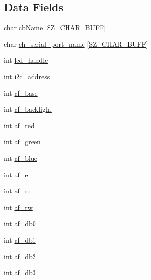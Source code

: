 \subsection*{Data Fields}
\begin{DoxyCompactItemize}
\item 
char \hyperlink{struct___i_i_c_l_c_d_a3f9347595482a6da5cb5d536d937a554}{cb\+Name} \mbox{[}\hyperlink{skn__common__headers_8h_a8d2978ad614b0de81c60483e706d9306}{S\+Z\+\_\+\+C\+H\+A\+R\+\_\+\+B\+U\+F\+F}\mbox{]}
\item 
char \hyperlink{struct___i_i_c_l_c_d_a2f193b0806fdbba1d644567835e2b2e8}{ch\+\_\+serial\+\_\+port\+\_\+name} \mbox{[}\hyperlink{skn__common__headers_8h_a8d2978ad614b0de81c60483e706d9306}{S\+Z\+\_\+\+C\+H\+A\+R\+\_\+\+B\+U\+F\+F}\mbox{]}
\item 
int \hyperlink{struct___i_i_c_l_c_d_afc74b2d9120be4a8e69e48b220d6781c}{lcd\+\_\+handle}
\item 
int \hyperlink{struct___i_i_c_l_c_d_a3f3fe8757875939b987ac0c416081551}{i2c\+\_\+address}
\item 
int \hyperlink{struct___i_i_c_l_c_d_ae74954b1b96523d617a68e42c2663086}{af\+\_\+base}
\item 
int \hyperlink{struct___i_i_c_l_c_d_ad160086a31276fbaf849855519b9878e}{af\+\_\+backlight}
\item 
int \hyperlink{struct___i_i_c_l_c_d_aca8ab39cfa9f683b2d03269886a0f633}{af\+\_\+red}
\item 
int \hyperlink{struct___i_i_c_l_c_d_a70176d63c9065d4186f55ae8328a82d3}{af\+\_\+green}
\item 
int \hyperlink{struct___i_i_c_l_c_d_ad64bc4c5fc6a592f161e594f0b2433e1}{af\+\_\+blue}
\item 
int \hyperlink{struct___i_i_c_l_c_d_a896f8305b5c0395ea7f9074904047b32}{af\+\_\+e}
\item 
int \hyperlink{struct___i_i_c_l_c_d_af738bf1e020daaa5476b917c375e807a}{af\+\_\+rs}
\item 
int \hyperlink{struct___i_i_c_l_c_d_ad0162f6a3e82c34192c0d901ef0ff6be}{af\+\_\+rw}
\item 
int \hyperlink{struct___i_i_c_l_c_d_a86dfd51ffdc849569bc91bba9f9cd4a6}{af\+\_\+db0}
\item 
int \hyperlink{struct___i_i_c_l_c_d_a114a5f81c889fe857d714a3a5033b397}{af\+\_\+db1}
\item 
int \hyperlink{struct___i_i_c_l_c_d_a7b88e6903c8fb93882c396261ffe40b5}{af\+\_\+db2}
\item 
int \hyperlink{struct___i_i_c_l_c_d_a26f362cb78eb2227a14706e9c992a066}{af\+\_\+db3}

\end{DoxyCompactItemize}
